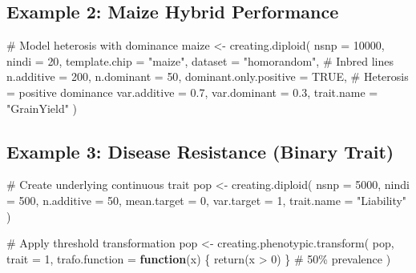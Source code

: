 \documentclass[
  letterpaper,
]{book}
\newenvironment{Shaded}{\begin{snugshade}}{\end{snugshade}}
\newcommand{\AttributeTok}[1]{\textcolor[rgb]{0.40,0.45,0.13}{#1}}
\newcommand{\CommentTok}[1]{\textcolor[rgb]{0.37,0.37,0.37}{#1}}
\newcommand{\ConstantTok}[1]{\textcolor[rgb]{0.56,0.35,0.01}{#1}}
\newcommand{\ControlFlowTok}[1]{\textcolor[rgb]{0.00,0.23,0.31}{\textbf{#1}}}
\newcommand{\DecValTok}[1]{\textcolor[rgb]{0.68,0.00,0.00}{#1}}
\newcommand{\FloatTok}[1]{\textcolor[rgb]{0.68,0.00,0.00}{#1}}
\newcommand{\FunctionTok}[1]{\textcolor[rgb]{0.28,0.35,0.67}{#1}}
\newcommand{\NormalTok}[1]{\textcolor[rgb]{0.00,0.23,0.31}{#1}}
\newcommand{\OtherTok}[1]{\textcolor[rgb]{0.00,0.23,0.31}{#1}}
\newcommand{\SpecialCharTok}[1]{\textcolor[rgb]{0.37,0.37,0.37}{#1}}
\newcommand{\StringTok}[1]{\textcolor[rgb]{0.13,0.47,0.30}{#1}}
\begin{document}
\subsection{Example 2: Maize Hybrid
Performance}\label{example-2-maize-hybrid-performance}

\begin{Shaded}
\begin{Highlighting}[]
\CommentTok{\# Model heterosis with dominance}
\NormalTok{maize }\OtherTok{\textless{}{-}} \FunctionTok{creating.diploid}\NormalTok{(}
  \AttributeTok{nsnp =} \DecValTok{10000}\NormalTok{,}
  \AttributeTok{nindi =} \DecValTok{20}\NormalTok{,}
  \AttributeTok{template.chip =} \StringTok{"maize"}\NormalTok{,}
  \AttributeTok{dataset =} \StringTok{"homorandom"}\NormalTok{,      }\CommentTok{\# Inbred lines}
  \AttributeTok{n.additive =} \DecValTok{200}\NormalTok{,}
  \AttributeTok{n.dominant =} \DecValTok{50}\NormalTok{,}
  \AttributeTok{dominant.only.positive =} \ConstantTok{TRUE}\NormalTok{,  }\CommentTok{\# Heterosis = positive dominance}
  \AttributeTok{var.additive =} \FloatTok{0.7}\NormalTok{,}
  \AttributeTok{var.dominant =} \FloatTok{0.3}\NormalTok{,}
  \AttributeTok{trait.name =} \StringTok{"GrainYield"}
\NormalTok{)}
\end{Highlighting}
\end{Shaded}

\subsection{Example 3: Disease Resistance (Binary
Trait)}\label{example-3-disease-resistance-binary-trait}

\begin{Shaded}
\begin{Highlighting}[]
\CommentTok{\# Create underlying continuous trait}
\NormalTok{pop }\OtherTok{\textless{}{-}} \FunctionTok{creating.diploid}\NormalTok{(}
  \AttributeTok{nsnp =} \DecValTok{5000}\NormalTok{, }\AttributeTok{nindi =} \DecValTok{500}\NormalTok{,}
  \AttributeTok{n.additive =} \DecValTok{50}\NormalTok{,}
  \AttributeTok{mean.target =} \DecValTok{0}\NormalTok{,}
  \AttributeTok{var.target =} \DecValTok{1}\NormalTok{,}
  \AttributeTok{trait.name =} \StringTok{"Liability"}
\NormalTok{)}

\CommentTok{\# Apply threshold transformation}
\NormalTok{pop }\OtherTok{\textless{}{-}} \FunctionTok{creating.phenotypic.transform}\NormalTok{(}
\NormalTok{  pop,}
  \AttributeTok{trait =} \DecValTok{1}\NormalTok{,}
  \AttributeTok{trafo.function =} \ControlFlowTok{function}\NormalTok{(x) \{ }\FunctionTok{return}\NormalTok{(x }\SpecialCharTok{\textgreater{}} \DecValTok{0}\NormalTok{) \}  }\CommentTok{\# 50\% prevalence}
\NormalTok{)}
\end{Highlighting}
\end{Shaded}
\end{document}
